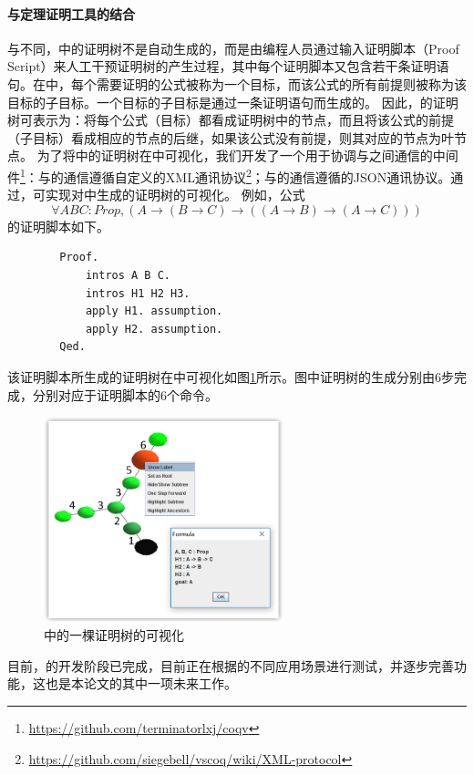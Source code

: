 \paragraph{与定理证明工具的结合}
与\sctlprov{}不同，中的证明树不是自动生成的，而是由编程人员通过输入证明脚本（Proof Script）来人工干预证明树的产生过程，其中每个证明脚本又包含若干条证明语句。在中，每个需要证明的公式被称为一个目标，而该公式的所有前提则被称为该目标的子目标。一个目标的子目标是通过一条证明语句而生成的。
因此，的证明树可表示为：将每个公式（目标）都看成证明树中的节点，而且将该公式的前提（子目标）看成相应的节点的后继，如果该公式没有前提，则其对应的节点为叶节点。
为了将中的证明树在中可视化，我们开发了一个用于协调与之间通信的中间件\footnote{\url{https://github.com/terminatorlxj/coqv}}：与的通信遵循自定义的XML通讯协议\footnote{\url{https://github.com/siegebell/vscoq/wiki/XML-protocol}}；与的通信遵循的JSON通讯协议。通过，可实现对中生成的证明树的可视化。
例如，公式$$\forall A B C: Prop, (A\rightarrow(B\rightarrow C)\rightarrow ((A\rightarrow B)\rightarrow(A\rightarrow C)))$$的证明脚本如下。
\begin{center}
		\begin{verbatim}
		Proof.
		    intros A B C.
		    intros H1 H2 H3.
		    apply H1. assumption.
		    apply H2. assumption.
		Qed.
		\end{verbatim}
	
\end{center}
该证明脚本所生成的证明树在中可视化如图\ref{vmdv:coq:vis}所示。图中证明树的生成分别由6步完成，分别对应于证明脚本的6个命令。
\begin{figure}[h!]
	\centering
	\caption{中的一棵证明树的可视化}
	\label{vmdv:coq:vis}
	\includegraphics[width=7cm]{Img/coq_example.png}
	
\end{figure}
目前，的开发阶段已完成，目前正在根据的不同应用场景进行测试，并逐步完善功能，这也是本论文的其中一项未来工作。

